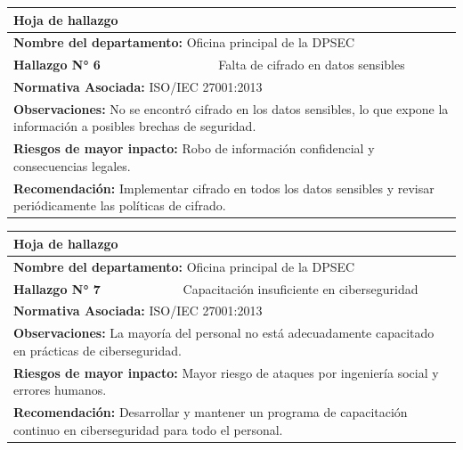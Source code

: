 \documentclass[12pt,a4paper]{article}
\begin{document}
    \par
    \begin{tabular}{ |p{4cm}|p{4cm}|p{4cm}|  }
        \hline  
        \multicolumn{3}{|l|}{\textbf{Hoja de hallazgo}} \\
        \hline
        \multicolumn{3}{|l|}{\textbf{Nombre del departamento: } Oficina principal de la DPSEC} \\
        \hline
        \textbf{Hallazgo N° 6}  & \multicolumn{2}{|c|}{  Falta de cifrado en datos sensibles } \\
        \hline
        \multicolumn{3}{|l|}{\textbf{Normativa Asociada: } ISO/IEC 27001:2013 } \\
        \hline
        \multicolumn{3}{|l|}{\textbf{Observaciones: } No se encontró cifrado en los datos sensibles, lo que expone la información a posibles brechas de seguridad. } \\
        \hline
        \multicolumn{3}{|l|}{\textbf{Riesgos de mayor inpacto: } Robo de información confidencial y consecuencias legales. } \\
        \hline
        \multicolumn{3}{|l|}{\textbf{Recomendación: } Implementar cifrado en todos los datos sensibles y revisar periódicamente las políticas de cifrado. } \\
        \hline
    \end{tabular}
    \par
    \begin{tabular}{ |p{4cm}|p{4cm}|p{4cm}|  }
        \hline  
        \multicolumn{3}{|l|}{\textbf{Hoja de hallazgo}} \\
        \hline
        \multicolumn{3}{|l|}{\textbf{Nombre del departamento: } Oficina principal de la DPSEC} \\
        \hline
        \textbf{Hallazgo N° 7}  & \multicolumn{2}{|c|}{ Capacitación insuficiente en ciberseguridad } \\
        \hline
        \multicolumn{3}{|l|}{\textbf{Normativa Asociada: } ISO/IEC 27001:2013 } \\
        \hline
        \multicolumn{3}{|l|}{\textbf{Observaciones: } La mayoría del personal no está adecuadamente capacitado en prácticas de ciberseguridad.} \\
        \hline
        \multicolumn{3}{|l|}{\textbf{Riesgos de mayor inpacto: } Mayor riesgo de ataques por ingeniería social y errores humanos. } \\
        \hline
        \multicolumn{3}{|l|}{\textbf{Recomendación: } Desarrollar y mantener un programa de capacitación continuo en ciberseguridad para todo el personal. } \\
        \hline
    \end{tabular}
\end{document}
